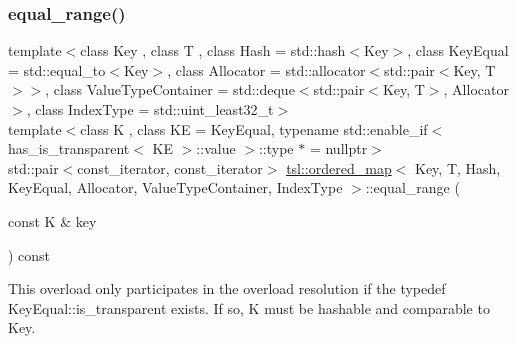 \subsubsection{\texorpdfstring{equal\_range()}{equal\_range()}\hspace{0.1cm}{\footnotesize\ttfamily [5/6]}}
{\footnotesize\ttfamily template$<$class Key , class T , class Hash  = std\+::hash$<$\+Key$>$, class Key\+Equal  = std\+::equal\+\_\+to$<$\+Key$>$, class Allocator  = std\+::allocator$<$std\+::pair$<$\+Key, T$>$$>$, class Value\+Type\+Container  = std\+::deque$<$std\+::pair$<$\+Key, T$>$, Allocator$>$, class Index\+Type  = std\+::uint\+\_\+least32\+\_\+t$>$ \\
template$<$class K , class KE  = Key\+Equal, typename std\+::enable\+\_\+if$<$ has\+\_\+is\+\_\+transparent$<$ K\+E $>$\+::value $>$\+::type $\ast$  = nullptr$>$ \\
std\+::pair$<$const\+\_\+iterator, const\+\_\+iterator$>$ \mbox{\hyperlink{classtsl_1_1ordered__map}{tsl\+::ordered\+\_\+map}}$<$ Key, T, Hash, Key\+Equal, Allocator, Value\+Type\+Container, Index\+Type $>$\+::equal\+\_\+range (\begin{DoxyParamCaption}\item[{const K \&}]{key }\end{DoxyParamCaption}) const\hspace{0.3cm}{\ttfamily [inline]}}





This overload only participates in the overload resolution if the typedef Key\+Equal\+::is\+\_\+transparent exists. If so, K must be hashable and comparable to Key. \mbox{\label{classtsl_1_1ordered__map_a385534c97891dda963deb464945b71d1}} 
